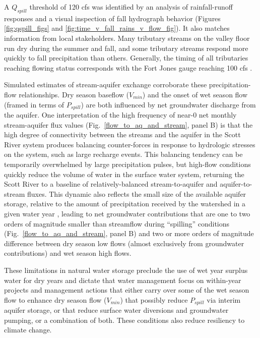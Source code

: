 \documentclass[hess, manuscript]{copernicus}
\begin{document}
A $Q_{spill}$ threshold of 120 cfs was identified by an analysis of
rainfall-runoff responses and a visual inspection of fall hydrograph
behavior (Figures \ref{fig:qspill_figs} and
\ref{fig:time_v_fall_rains_v_flow_fig}). It also matches information
from local stakeholders. Many tributary streams on the valley floor run
dry during the summer and fall, and some tributary streams respond more
quickly to fall precipitation than others. Generally, the timing of all
tributaries reaching flowing status corresponds with the Fort Jones
gauge reaching 100 cfs \citep{Sommarstrom2020}.

Simulated estimates of stream-aquifer exchange corroborate these
precipitation-flow relationships. Dry season baseflow ($V_{min}$) and
the onset of wet season flow (framed in terms of $P_{spill}$) are both
influenced by net groundwater discharge from the aquifer. One
interpretation of the high frequency of near-0 net monthly
stream-aquifer flux values (Fig.~\ref{flow_to_aq_and_stream}, panel
B) is that the high degree of connectivity between the streams and the
aquifer in the Scott River system produces balancing counter-forces in
response to hydrologic stresses on the system, such as large recharge
events. This balancing tendency can be temporarily overwhelmed by large
precipitation pulses, but high-flow conditions quickly reduce the volume
of water in the surface water system, returning the Scott River to a
baseline of relatively-balanced stream-to-aquifer and aquifer-to-stream
fluxes. This dynamic also reflects the small size of the available
aquifer storage, relative to the amount of precipitation received by the
watershed in a given water year \citep{DWR2004}, leading to
net groundwater contributions that are one to two orders of magnitude
smaller than streamflow during ``spilling'' conditions
(Fig.~\ref{flow_to_aq_and_stream}, panel B) and two or more orders of
magnitude difference between dry season low flows (almost exclusively
from groundwater contributions) and wet season high flows.

These limitations in natural water storage preclude the use of wet year
surplus water for dry years and dictate that water management focus on
within-year projects and management actions that either carry over some
of the wet season flow to enhance dry season flow ($V_{min}$) that
possibly reduce $P_{spill}$ via interim aquifer storage, or that
reduce surface water diversions and groundwater pumping, or a
combination of both. These conditions also reduce resiliency to climate
change.
\end{document}
